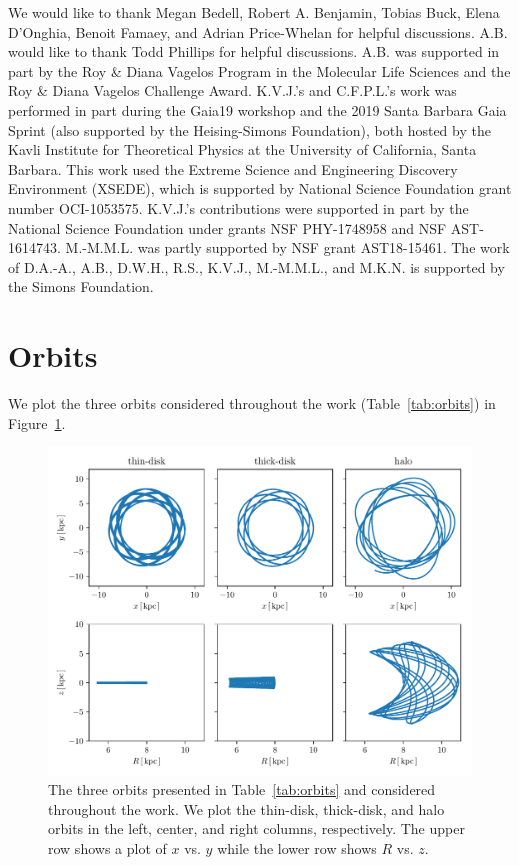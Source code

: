 \documentclass[twocolumn]{aastex62}
\begin{document}
\acknowledgments
We would like to thank Megan Bedell, Robert A. Benjamin, Tobias Buck, Elena
D'Onghia, Benoit Famaey, and Adrian Price-Whelan for helpful discussions. A.B.
would like to thank Todd Phillips for helpful discussions. A.B. was supported
in part by the Roy \& Diana Vagelos Program in the Molecular Life Sciences and
the Roy \& Diana Vagelos Challenge Award. K.V.J.'s and C.F.P.L.'s work was
performed in part during the Gaia19 workshop and the 2019 Santa Barbara Gaia
Sprint (also supported by the Heising-Simons Foundation), both hosted by the
Kavli Institute for Theoretical Physics at the University of California, Santa
Barbara. This work used the Extreme Science and Engineering Discovery
Environment (XSEDE), which is supported by National Science Foundation grant
number OCI-1053575. K.V.J.'s contributions were supported in part by the
National Science Foundation under grants NSF PHY-1748958 and NSF AST-1614743.
M.-M.M.L. was partly supported by NSF grant AST18-15461. The work of D.A.-A.,
A.B., D.W.H., R.S., K.V.J., M.-M.M.L., and M.K.N. is supported by the Simons
Foundation.

\appendix
\section{Orbits} \label{app:orbits}
We plot the three orbits considered throughout the work
(Table~\ref{tab:orbits}) in Figure~\ref{fig:plot_orbits}.

\begin{figure}[htb!]
\begin{center}
\includegraphics[width=\textwidth]{fig/orbits.pdf}
\end{center}
\caption{The three orbits presented in Table~\ref{tab:orbits} and considered
throughout the work. We plot the thin-disk, thick-disk, and halo orbits in the
left, center, and right columns, respectively. The upper row shows a plot of
$x$ vs. $y$ while the lower row shows $R$ vs. $z$.}
\label{fig:plot_orbits}
\end{figure}
\end{document}
